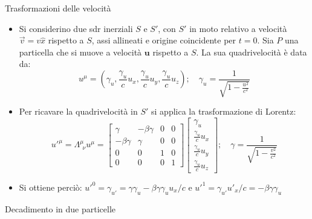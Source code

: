 \documentclass[a4_2,grid,frame]{flashcards}
\newenvironment{cartaflash}
    {\vspace{-15pt}
    \begin{itemize}
    }
    {
    \end{itemize}
    }
\begin{document}
\begin{flashcard}[Trasformazioni]{Trasformazioni delle velocità}
\begin{cartaflash}
\item Si considerino due sdr inerziali $S$ e $S'$, con $S'$ in moto relativo a velocità $\vec{v} = v\hat{x}$ rispetto a $S$, assi allineati e origine coincidente per $t=0$. Sia $P$ una particella che si muove a velocità $\bm{u}$ rispetto a $S$. La sua quadrivelocità è data da:
\[
u^\mu = \left (\gamma_u, \frac{\gamma_u}{c} u_x, \frac{\gamma_u}{c} u_y, \frac{\gamma_u}{c}u_z \right ); \quad \gamma_u = \frac{1}{\sqrt{1-\frac{u^2}{c^2}}}
\]
\item Per ricavare la quadrivelocità in $S'$ si applica la trasformazione di Lorentz:
\[
u'^\mu = \Lambda^\mu_{\>\>\nu} u^\mu = \begin{bmatrix}
\gamma & -\beta\gamma & 0 & 0\\
-\beta\gamma & \gamma & 0 & 0\\
0 & 0 & 1 & 0\\
0 & 0 & 0 & 1
\end{bmatrix}
\begin{bmatrix}
\gamma_u \\ \frac{\gamma_u}{c}u_x \\ \frac{\gamma_u}{c}u_y \\ \frac{\gamma_u}{c}u_z
\end{bmatrix}
;\quad \gamma = \frac{1}{\sqrt{1-\frac{v^2}{c^2}}}
\]
\item Si ottiene perciò: $u'^0 = \gamma_{u'} = \gamma\gamma_u - \beta\gamma\gamma_u u_x/c$ e $u'^1 = \gamma_{u'} u'_x /c = -\beta\gamma\gamma_u $
\end{cartaflash}
\end{flashcard}

\begin{flashcard}[Esempio]{Decadimento in due particelle}
\begin{cartaflash}

\end{cartaflash}
\end{flashcard}
\end{document}

